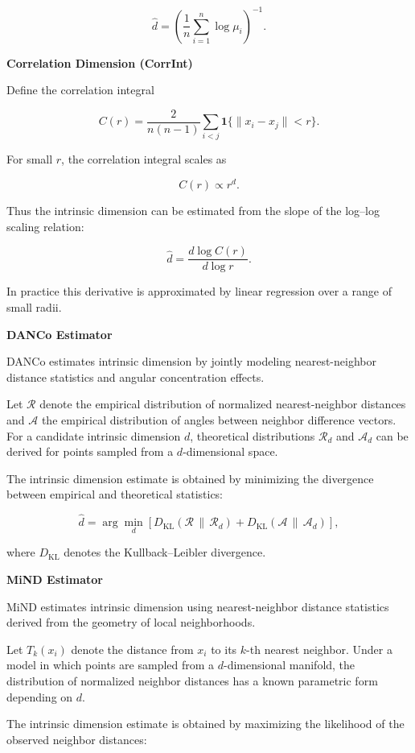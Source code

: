 \documentclass[11pt]{article}
\begin{document}
\[
\hat d =
\left(
\frac{1}{n}\sum_{i=1}^n \log \mu_i
\right)^{-1}.
\]

\textbf{Correlation Dimension (CorrInt)} \cite{grassberger1983}

Define the correlation integral

\[
C(r) =
\frac{2}{n(n-1)}
\sum_{i<j}
\mathbf{1}\{\|x_i-x_j\| < r\}.
\]

For small $r$, the correlation integral scales as

\[
C(r) \propto r^d .
\]

Thus the intrinsic dimension can be estimated from the slope of the log--log scaling relation:

\[
\hat d =
\frac{d \log C(r)}{d \log r}.
\]

In practice this derivative is approximated by linear regression over a range of small radii.

\textbf{DANCo Estimator} \cite{ceruti2014}

DANCo estimates intrinsic dimension by jointly modeling nearest-neighbor distance statistics and angular concentration effects.

Let $\mathcal{R}$ denote the empirical distribution of normalized nearest-neighbor distances and $\mathcal{A}$ the empirical distribution of angles between neighbor difference vectors. 
For a candidate intrinsic dimension $d$, theoretical distributions $\mathcal{R}_d$ and $\mathcal{A}_d$ can be derived for points sampled from a $d$-dimensional space.

The intrinsic dimension estimate is obtained by minimizing the divergence between empirical and theoretical statistics:

\[
\hat d =
\arg\min_d
\left[
D_{\mathrm{KL}}(\mathcal{R}\,\|\,\mathcal{R}_d)
+
D_{\mathrm{KL}}(\mathcal{A}\,\|\,\mathcal{A}_d)
\right],
\]

where $D_{\mathrm{KL}}$ denotes the Kullback--Leibler divergence.

\textbf{MiND Estimator} \cite{rozza2012}

MiND estimates intrinsic dimension using nearest-neighbor distance statistics derived from the geometry of local neighborhoods.

Let $T_k(x_i)$ denote the distance from $x_i$ to its $k$-th nearest neighbor. 
Under a model in which points are sampled from a $d$-dimensional manifold, the distribution of normalized neighbor distances has a known parametric form depending on $d$.

The intrinsic dimension estimate is obtained by maximizing the likelihood of the observed neighbor distances:
\end{document}
